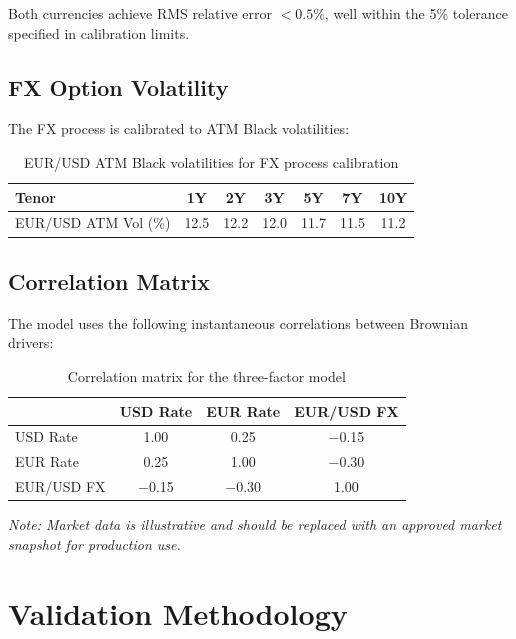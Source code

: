 \documentclass[conference]{IEEEtran}
\begin{document}
\noindent Both currencies achieve RMS relative error $< 0.5\%$, well within the 5\% tolerance specified in calibration limits.

\subsection{FX Option Volatility}

The FX process is calibrated to ATM Black volatilities:

\begin{table}[H]
\centering
\begin{tabular}{lcccccc}
\toprule
\textbf{Tenor} & 1Y & 2Y & 3Y & 5Y & 7Y & 10Y \\
\midrule
EUR/USD ATM Vol (\%) & 12.5 & 12.2 & 12.0 & 11.7 & 11.5 & 11.2 \\
\bottomrule
\end{tabular}
\caption{EUR/USD ATM Black volatilities for FX process calibration}
\end{table}

\subsection{Correlation Matrix}

The model uses the following instantaneous correlations between Brownian drivers:

\begin{table}[H]
\centering
\begin{tabular}{lccc}
\toprule
& USD Rate & EUR Rate & EUR/USD FX \\
\midrule
USD Rate & 1.00 & 0.25 & $-$0.15 \\
EUR Rate & 0.25 & 1.00 & $-$0.30 \\
EUR/USD FX & $-$0.15 & $-$0.30 & 1.00 \\
\bottomrule
\end{tabular}
\caption{Correlation matrix for the three-factor model}
\end{table}

\noindent\textit{Note: Market data is illustrative and should be replaced with an approved market snapshot for production use.}

\section{Validation Methodology}
\end{document}
